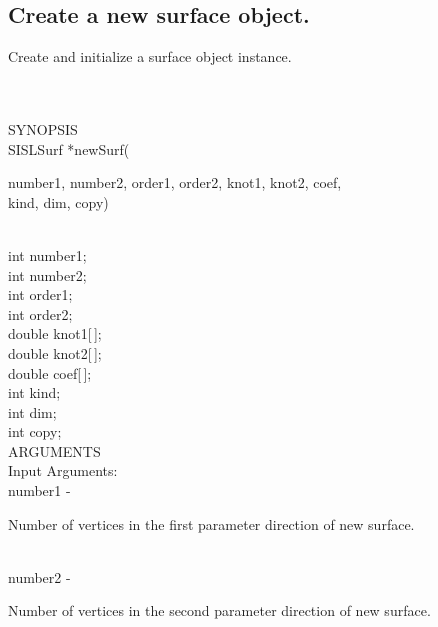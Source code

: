 \subsection{Create a new surface object.}
\begin{minipg1}
Create and initialize a surface object instance.
\end{minipg1} \\ \\
SYNOPSIS\\
        \>SISLSurf *newSurf(\begin{minipg3}
        {\fov number}1, {\fov number}2, {\fov order}1, {\fov order}2, {\fov knot}1, {\fov knot}2, {\fov coef},\\ {\fov kind}, {\fov dim}, {\fov copy})
                \end{minipg3}\\[0.3ex]
                \>\>    int    \>       {\fov number}1;\\
                \>\>    int    \>       {\fov number}2;\\
                \>\>    int    \>       {\fov order}1;\\
                \>\>    int    \>       {\fov order}2;\\
                \>\>    double \>       {\fov knot1}[\,];\\
                \>\>    double \>       {\fov knot2}[\,];\\
                \>\>    double \>       {\fov coef}[\,];\\
                \>\>    int    \>       {\fov kind};\\
                \>\>    int    \>       {\fov dim};\\
                \>\>    int    \>       {\fov copy};\\
ARGUMENTS\\
        \>Input Arguments:\\
        \>\>    {\fov number}1  \> - \> \begin{minipg2}
                        Number of vertices in the first parameter direction
                        of new surface.
                                \end{minipg2}\\[0.8ex]
        \>\>    {\fov number}2  \> - \> \begin{minipg2}
                        Number of vertices in the second parameter direction
                        of new surface.
                                \end{minipg2}\\[0.8ex]
